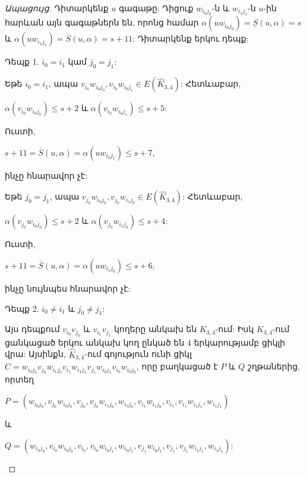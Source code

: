 \begin{hide}
\begin{proof}[Ապացույց]
Դիտարկենք $u$ գագաթը: Դիցուք $w_{i_{0}j_{0}}$-ն և $w_{i_{1}j_{1}}$-ն
$u$-ին հարևան այն գագաթներն են, որոնց համար 
$\alpha(uw_{i_{0}j_{0}})=\underline{S}(u,\alpha)=s$ և
$\alpha(uw_{i_{1}j_{1}})=\overline{S}(u,\alpha)=s+11$: Դիտարկենք երկու դեպք:

Դեպք 1. $i_{0}=i_{1}$ կամ $j_{0}=j_{1}$:

Եթե $i_{0}=i_{1}$, ապա
$v_{i_{0}}w_{i_{0}j_{0}},v_{i_{0}}w_{i_{0}j_{1}}\in
E(\widehat{K}_{3,4})$: Հետևաբար,

\begin{center}
$\alpha(v_{i_{0}}w_{i_{0}j_{0}})\leq s+2$ և
$\alpha(v_{i_{0}}w_{i_{0}j_{1}})\leq s+5$:
\end{center}

Ուստի,
\begin{center}
$s+11=\overline{S}(u,\alpha)=\alpha(uw_{i_{0}j_{1}})\leq s+7$,
\end{center}
ինչը հնարավոր չէ:

Եթե $j_{0}=j_{1}$, ապա
$v_{j_{0}}w_{i_{0}j_{0}},v_{j_{0}}w_{i_{1}j_{0}}\in
E(\widehat{K}_{3,4})$: Հետևաբար,

\begin{center}
$\alpha(v_{j_{0}}w_{i_{0}j_{0}})\leq s+2$ և
$\alpha(v_{j_{0}}w_{i_{1}j_{0}})\leq s+4$:
\end{center}

Ուստի,
\begin{center}
$s+11=\overline{S}(u,\alpha)=\alpha(uw_{i_{1}j_{0}})\leq s+6$,
\end{center}
ինչը նույնպես հնարավոր չէ:

Դեպք 2. $i_{0}\neq i_{1}$ և $j_{0}\neq j_{1}$:

Այս դեպքում $v_{i_{0}}v_{j_{0}}$ և $v_{i_{1}}v_{j_{1}}$ կողերը անկախ են $K_{3,4}$-ում: Իսկ
$K_{3,4}$-ում ցանկացած երկու անկախ կող ընկած են 4 երկարությամբ ցիկլի վրա: Այսինքն, $\widehat{K}_{3,4}$-ում գոյություն ունի ցիկլ
$C=w_{i_{0}j_{0}}v_{j_{0}}w_{i_{1}j_{0}}v_{i_{1}}w_{i_{1}j_{1}}v_{j_{1}}w_{i_{0}j_{1}}v_{i_{0}}w_{i_{0}j_{0}}$, որը բաղկացած է $P$ և $Q$ շղթաներից, որտեղ
\begin{center}
$P=\left(w_{i_{0}j_{0}},v_{j_{0}}w_{i_{0}j_{0}},v_{j_{0}},v_{j_{0}}w_{i_{1}j_{0}},w_{i_{1}j_{0}},v_{i_{1}}w_{i_{1}j_{0}},v_{i_{1}},v_{i_{1}}w_{i_{1}j_{1}},w_{i_{1}j_{1}}\right)$
\end{center}
և
\begin{center}
$Q=\left(w_{i_{0}j_{0}},v_{i_{0}}w_{i_{0}j_{0}},v_{i_{0}},v_{i_{0}}w_{i_{0}j_{1}},w_{i_{0}j_{1}},v_{j_{1}}w_{i_{0}j_{1}},v_{j_{1}},v_{j_{1}}w_{i_{1}j_{1}},w_{i_{1}j_{1}}\right)$:
\end{center}


\end{proof}
\end{hide}
